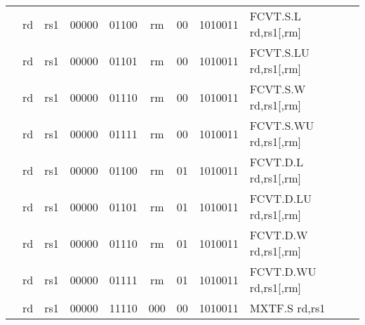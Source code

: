 \begin{table}[p]
\begin{small}
\begin{center}
\begin{tabular}{rccccccccccl}
&
\multicolumn{1}{|c|}{rd} &
\multicolumn{1}{c|}{rs1} &
\multicolumn{1}{c|}{00000} &
\multicolumn{3}{c|}{01100} &
\multicolumn{2}{c|}{rm} &
\multicolumn{1}{c|}{00} &
\multicolumn{1}{c|}{1010011} & FCVT.S.L rd,rs1[,rm] \\
\cline{2-11}
  

&
\multicolumn{1}{|c|}{rd} &
\multicolumn{1}{c|}{rs1} &
\multicolumn{1}{c|}{00000} &
\multicolumn{3}{c|}{01101} &
\multicolumn{2}{c|}{rm} &
\multicolumn{1}{c|}{00} &
\multicolumn{1}{c|}{1010011} & FCVT.S.LU rd,rs1[,rm] \\
\cline{2-11}
  

&
\multicolumn{1}{|c|}{rd} &
\multicolumn{1}{c|}{rs1} &
\multicolumn{1}{c|}{00000} &
\multicolumn{3}{c|}{01110} &
\multicolumn{2}{c|}{rm} &
\multicolumn{1}{c|}{00} &
\multicolumn{1}{c|}{1010011} & FCVT.S.W rd,rs1[,rm] \\
\cline{2-11}
  

&
\multicolumn{1}{|c|}{rd} &
\multicolumn{1}{c|}{rs1} &
\multicolumn{1}{c|}{00000} &
\multicolumn{3}{c|}{01111} &
\multicolumn{2}{c|}{rm} &
\multicolumn{1}{c|}{00} &
\multicolumn{1}{c|}{1010011} & FCVT.S.WU rd,rs1[,rm] \\
\cline{2-11}
  

&
\multicolumn{1}{|c|}{rd} &
\multicolumn{1}{c|}{rs1} &
\multicolumn{1}{c|}{00000} &
\multicolumn{3}{c|}{01100} &
\multicolumn{2}{c|}{rm} &
\multicolumn{1}{c|}{01} &
\multicolumn{1}{c|}{1010011} & FCVT.D.L rd,rs1[,rm] \\
\cline{2-11}
  

&
\multicolumn{1}{|c|}{rd} &
\multicolumn{1}{c|}{rs1} &
\multicolumn{1}{c|}{00000} &
\multicolumn{3}{c|}{01101} &
\multicolumn{2}{c|}{rm} &
\multicolumn{1}{c|}{01} &
\multicolumn{1}{c|}{1010011} & FCVT.D.LU rd,rs1[,rm] \\
\cline{2-11}
  

&
\multicolumn{1}{|c|}{rd} &
\multicolumn{1}{c|}{rs1} &
\multicolumn{1}{c|}{00000} &
\multicolumn{3}{c|}{01110} &
\multicolumn{2}{c|}{rm} &
\multicolumn{1}{c|}{01} &
\multicolumn{1}{c|}{1010011} & FCVT.D.W rd,rs1[,rm] \\
\cline{2-11}
  

&
\multicolumn{1}{|c|}{rd} &
\multicolumn{1}{c|}{rs1} &
\multicolumn{1}{c|}{00000} &
\multicolumn{3}{c|}{01111} &
\multicolumn{2}{c|}{rm} &
\multicolumn{1}{c|}{01} &
\multicolumn{1}{c|}{1010011} & FCVT.D.WU rd,rs1[,rm] \\
\cline{2-11}
  

&
\multicolumn{1}{|c|}{rd} &
\multicolumn{1}{c|}{rs1} &
\multicolumn{1}{c|}{00000} &
\multicolumn{3}{c|}{11110} &
\multicolumn{2}{c|}{000} &
\multicolumn{1}{c|}{00} &
\multicolumn{1}{c|}{1010011} & MXTF.S rd,rs1 \\
\cline{2-11}
  


\end{tabular}
\end{center}
\end{small}
\end{table}
